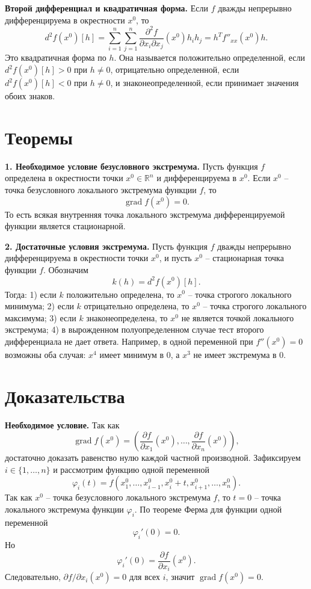 \documentclass[12pt,a4paper]{article}
\newcommand{\R}{\mathbb{R}}
\newcommand{\grad}{\operatorname{grad}}
\begin{document}
\textbf{Второй дифференциал и квадратичная форма.}
Если \(f\) дважды непрерывно дифференцируема в окрестности \(x^0\), то
\[
  d^2 f(x^0)[h]
  =
  \sum_{i=1}^n\sum_{j=1}^n
  \frac{\partial^2 f}{\partial x_i\partial x_j}(x^0)h_i h_j
  =
  h^T f''_{xx}(x^0)h.
\]
Это квадратичная форма по \(h\). Она называется положительно определенной,
если \(d^2 f(x^0)[h]>0\) при \(h\ne0\), отрицательно определенной, если
\(d^2 f(x^0)[h]<0\) при \(h\ne0\), и знаконеопределенной, если принимает
значения обоих знаков.

\section*{Теоремы}

\textbf{1. Необходимое условие безусловного экстремума.}
Пусть функция \(f\) определена в окрестности точки \(x^0\in\R^n\) и
дифференцируема в \(x^0\). Если \(x^0\) -- точка безусловного локального
экстремума функции \(f\), то
\[
  \grad f(x^0)=0.
\]
То есть всякая внутренняя точка локального экстремума дифференцируемой
функции является стационарной.

\textbf{2. Достаточные условия экстремума.}
Пусть функция \(f\) дважды непрерывно дифференцируема в окрестности точки
\(x^0\), и пусть \(x^0\) -- стационарная точка функции \(f\). Обозначим
\[
  k(h)=d^2 f(x^0)[h].
\]
Тогда:
1) если \(k\) положительно определена, то \(x^0\) -- точка строгого
локального минимума;
2) если \(k\) отрицательно определена, то \(x^0\) -- точка строгого
локального максимума;
3) если \(k\) знаконеопределена, то \(x^0\) не является точкой локального
экстремума;
4) в вырожденном полуопределенном случае тест второго дифференциала не дает
ответа.
Например, в одной переменной при \(f''(x^0)=0\) возможны оба случая:
\(x^4\) имеет минимум в \(0\), а \(x^3\) не имеет экстремума в \(0\).

\section*{Доказательства}

\textbf{Необходимое условие.}
Так как
\[
  \grad f(x^0)=
  \left(
    \frac{\partial f}{\partial x_1}(x^0),\dots,
    \frac{\partial f}{\partial x_n}(x^0)
  \right),
\]
достаточно доказать равенство нулю каждой частной производной. Зафиксируем
\(i\in\{1,\dots,n\}\) и рассмотрим функцию одной переменной
\[
  \varphi_i(t)=
  f(x^0_1,\dots,x^0_{i-1},x^0_i+t,x^0_{i+1},\dots,x^0_n).
\]
Так как \(x^0\) -- точка безусловного локального экстремума \(f\), то
\(t=0\) -- точка локального экстремума функции \(\varphi_i\). По теореме
Ферма для функции одной переменной
\[
  \varphi_i'(0)=0.
\]
Но
\[
  \varphi_i'(0)=\frac{\partial f}{\partial x_i}(x^0).
\]
Следовательно, \(\partial f/\partial x_i(x^0)=0\) для всех \(i\), значит
\(\grad f(x^0)=0\).
\end{document}
